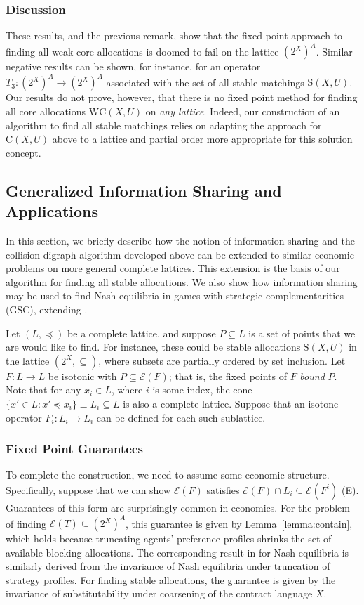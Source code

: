 \documentclass[11pt,reqno]{amsart}
\theoremstyle{definition}
\numberwithin{equation}{section}
\newcommand{\prealloc}{(2^X)^A}
\newcommand{\sub}{\subseteq}
\newcommand{\strcore}{\mathrm{C}(X,U)}
\newcommand{\core}{\mathrm{WC}(X,U)}
\newcommand{\stable}{\mathrm{S}(X,U)}
\newcommand{\fix}{\mathcal{E}}
\newcommand{\peq}{\preceq}
\newcommand{\opthree}{T_3}
\newcommand{\oper}{F}
\newcommand{\point}{P}
\newcommand{\lattice}{L}
\begin{document}
\subsubsection{Discussion} 
These results, and the previous remark, show that the fixed point approach to finding all weak core allocations is doomed to fail on the lattice $\prealloc$.
Similar negative results can be shown, for instance, for an operator $\opthree: \prealloc \to \prealloc$ associated with the set of all stable matchings $\stable$.
Our results do not prove, however, that there is no fixed point method for finding all core allocations $\core$ on \emph{any lattice}.
Indeed, our construction of an algorithm to find all stable matchings relies on adapting the approach for $\strcore$ above to a lattice and partial order more appropriate for this solution concept. 

\subsection{Generalized Information Sharing and Applications} \label{section:general}
In this section, we briefly describe how the notion of information sharing and the collision digraph algorithm developed above can be extended to similar economic problems on more general complete lattices.
This extension is the basis of our algorithm for finding all stable allocations. 
We also show how information sharing may be used to find Nash equilibria in games with strategic complementarities (GSC), extending \cite{Echenique2007Equilibria}.

Let $(\lattice,\peq)$ be a complete lattice, and suppose $\point \sub \lattice$ is a set of points that we are would like to find. 
For instance, these could be stable allocations $\stable$ in the lattice $(2^X,\sub)$, where subsets are partially ordered by set inclusion. 
Let $\oper: \lattice \to \lattice$ be isotonic with $\point \sub \fix(\oper)$; that is, the fixed points of $\oper$ \emph{bound} $\point$.
Note that for any $x_i \in \lattice$, where $i$ is some index, the cone $\{x' \in \lattice: x' \peq x_i\} \equiv \lattice_i \sub L$ is also a complete lattice.
Suppose that an isotone operator $F_i : \lattice_i \to \lattice_i$ can be defined for each such sublattice.

\subsubsection{Fixed Point Guarantees} 
To complete the construction, we need to assume some economic structure. 
Specifically, suppose that we can show $\fix(\oper)$ satisfies $\fix(\oper) \cap \lattice_i \sub \fix(\oper^i)$ (E).
Guarantees of this form are surprisingly common in economics.
For the problem of finding $\fix(T) \sub \prealloc$, this guarantee is given by Lemma~\ref{lemma:contain}, which holds because truncating agents' preference profiles shrinks the set of available blocking allocations.
The corresponding result in \cite{Echenique2007Equilibria} for Nash equilibria is similarly derived from the invariance of Nash equilibria under truncation of strategy profiles.
For finding stable allocations, the guarantee is given by the invariance of substitutability under coarsening of the contract language $X$.
\end{document}
